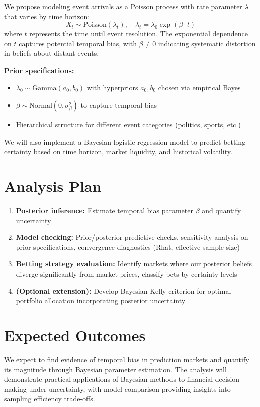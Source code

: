 \documentclass[11pt]{article}
\begin{document}
We propose modeling event arrivals as a Poisson process with rate parameter $\lambda$ that varies by time horizon:
\begin{equation}
X_t \sim \text{Poisson}(\lambda_t), \quad \lambda_t = \lambda_0 \exp(\beta \cdot t)
\end{equation}
where $t$ represents the time until event resolution. The exponential dependence on $t$ captures potential temporal bias, with $\beta \neq 0$ indicating systematic distortion in beliefs about distant events.

\textbf{Prior specifications:}
\begin{itemize}
    \item $\lambda_0 \sim \text{Gamma}(a_0, b_0)$ with hyperpriors $a_0, b_0$ chosen via empirical Bayes
    \item $\beta \sim \text{Normal}(0, \sigma^2_\beta)$ to capture temporal bias
    \item Hierarchical structure for different event categories (politics, sports, etc.)
\end{itemize}

We will also implement a Bayesian logistic regression model to predict betting certainty based on time horizon, market liquidity, and historical volatility.


\section{Analysis Plan}

\begin{enumerate}
    \item \textbf{Posterior inference:} Estimate temporal bias parameter $\beta$ and quantify uncertainty
    \item \textbf{Model checking:} Prior/posterior predictive checks, sensitivity analysis on prior specifications, convergence diagnostics (Rhat, effective sample size)
    \item \textbf{Betting strategy evaluation:} Identify markets where our posterior beliefs diverge significantly from market prices, classify bets by certainty levels
    \item \textbf{(Optional extension):} Develop Bayesian Kelly criterion for optimal portfolio allocation incorporating posterior uncertainty
\end{enumerate}

\section{Expected Outcomes}

We expect to find evidence of temporal bias in prediction markets and quantify its magnitude through Bayesian parameter estimation. The analysis will demonstrate practical applications of Bayesian methods to financial decision-making under uncertainty, with model comparison providing insights into sampling efficiency trade-offs.
\end{document}
